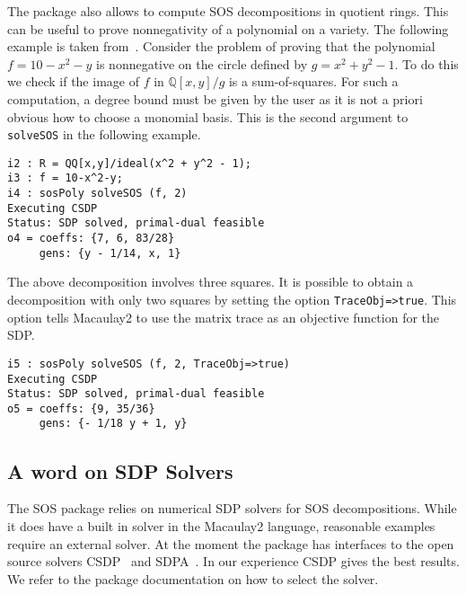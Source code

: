 \documentclass[11pt]{amsart}
\theoremstyle{plain}%
\theoremstyle{definition}
\theoremstyle{remark}
\newcommand{\Mac}{Macaulay2\xspace}
\newcommand{\SOS}{\textsc{SOS}\xspace}
\newcommand{\QQ}{\mathbb{Q}}
\begin{document}
The package also allows to compute SOS decompositions in quotient rings.
This can be useful to prove nonnegativity of a polynomial on a variety.  
The following example is taken from~\cite{parrilo2005exploiting}.  
Consider the problem of proving that the polynomial $f = 10-x^2-y$ is nonnegative on the circle defined by $g = x^2 + y^2 - 1$.
To do this we check if the image of $f$ in $\QQ[x,y]/g$ is a sum-of-squares.
For such a computation, a degree bound must be given by the user as it is not a priori obvious how to choose a monomial basis.
This is the second argument to \verb|solveSOS| in the following example.
{\small
\begin{verbatim}
i2 : R = QQ[x,y]/ideal(x^2 + y^2 - 1);
i3 : f = 10-x^2-y;
i4 : sosPoly solveSOS (f, 2)
Executing CSDP
Status: SDP solved, primal-dual feasible
o4 = coeffs: {7, 6, 83/28}      
     gens: {y - 1/14, x, 1}
\end{verbatim}
}
The above decomposition involves three squares.
It is possible to obtain a decomposition with only two squares by setting the option \verb|TraceObj=>true|.
This option tells \Mac to use the matrix trace as an objective function for the SDP.
{\small
\begin{verbatim}
i5 : sosPoly solveSOS (f, 2, TraceObj=>true)
Executing CSDP
Status: SDP solved, primal-dual feasible
o5 = coeffs: {9, 35/36}      
     gens: {- 1/18 y + 1, y} 
\end{verbatim}
}


\subsection*{A word on SDP Solvers}
The \SOS package relies on numerical SDP solvers for SOS decompositions.  
While it does have a built in solver in the \Mac language, 
reasonable examples require an external solver.
At the moment the package has interfaces to the open source solvers CSDP~\cite{borchers1999csdp} and SDPA~\cite{yamashita2003implementation}.
In our experience CSDP gives the best results.
We refer to the package documentation on how to select the solver.
\end{document}
